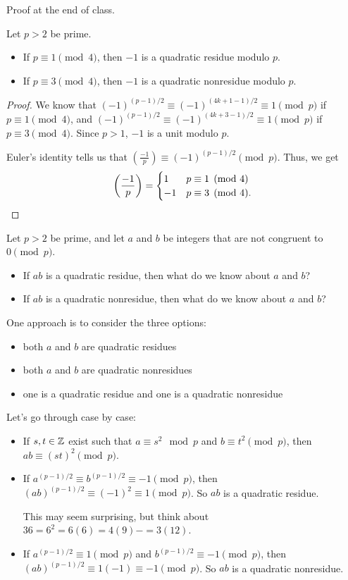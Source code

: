 \documentclass[letterpaper, 11 pt]{article}
\begin{document}
 Proof at the end of class.
  
\begin{thm}
 Let $p>2$ be prime.
\begin{itemize}
 \item If $p\equiv 1 \pmod 4$, then $-1$ is a quadratic residue modulo $p$.
 \item If $p\equiv 3 \pmod 4$, then $-1$ is a quadratic nonresidue modulo $p$.
\end{itemize}
\end{thm}
\begin{proof}
We know that $(-1)^{(p-1)/2}\equiv (-1)^{(4k+1-1)/2}\equiv 1 \pmod p$ if $p\equiv 1 \pmod 4$, and $(-1)^{(p-1)/2}\equiv (-1)^{(4k+3-1)/2}\equiv 1 \pmod p$ if $p\equiv 3 \pmod 4$. Since $p>1$, $-1$ is a unit modulo $p$.

Euler's identity tells us that $\left(\frac{-1}{p}\right)\equiv (-1)^{(p-1)/2} \pmod p$. Thus, we get \[\left(\frac{-1}{p}\right)=
\begin{cases}
 1 & p\equiv 1 \pmod 4\\
 -1 & p \equiv 3 \pmod 4.
\end{cases}\qedhere\]
\end{proof}

 
  Let $p>2$ be prime, and let $a$ and $b$ be integers that are not congruent to $0\pmod p$.
\begin{itemize}
\item If $ab$ is a quadratic residue, then what do we know about $a$ and $b$?
 \item If $ab$ is a quadratic nonresidue, then what do we know about $a$ and $b$?
\end{itemize}
 
 One approach is to consider the three options:
 
\begin{itemize}
 \item both $a$ and $b$ are quadratic residues
 \item both $a$ and $b$ are quadratic nonresidues
 \item one is a quadratic residue and one is a quadratic nonresidue
\end{itemize}

Let's go through case by case:
\begin{itemize}
 \item If $s,t\in\mathbb Z$ exist such that $a\equiv s^2 \mod p$ and $b\equiv t^2 \pmod p$, then $ab\equiv (st)^2 \pmod p$.
 \item If $a^{(p-1)/2}\equiv b^{(p-1)/2}\equiv -1\pmod p$, then $(ab)^{(p-1)/2}\equiv (-1)^2\equiv 1\pmod p$. So $ab$ is a quadratic residue.
 
 This may seem surprising, but think about $36=6^2=6(6)=4(9)-=3(12)$.
 
 \item If $a^{(p-1)/2}\equiv 1\pmod p$ and $b^{(p-1)/2}\equiv -1\pmod p$, then $(ab)^{(p-1)/2}\equiv 1(-1)\equiv -1\pmod p$. So $ab$ is a quadratic nonresidue.
\end{itemize}
  
\end{document}
